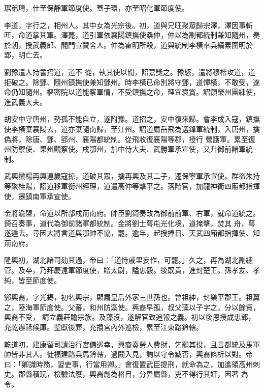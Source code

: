 \begin{pinyinscope}
 琚弟璹，仕至保靜軍節度使。蓋子環，亦至昭化軍節度使。



 李道，字行之，相州人。其中女為光宗後。初，道與兄旺聚眾歸宗澤，澤因事斬旺，命道掌其軍。澤薨，道引軍依襄陽鎮撫使桑仲，仲以為副都統制兼知隨州，奏於朝，授武義郎、閣門宣贊舍人。仲為霍明所殺，道與統制李橫率兵縞素圍明於郢，明亡去。



 劉豫遣人持書招道，道不
 從，執其使以聞，詔嘉獎之。豫怒，遣將穆楷攻道，道拒破之。除鄧、隨州鎮撫使兼知鄧州。時李橫已命別將守鄧，道憚橫，不敢受，遂命仍知隨州。樞密院以道能察軍情，不受鎮撫之命，理宜褒賞。詔領榮州團練使，進武義大夫。



 胡安中守唐州，勢孤不能自立，遂附豫。道招之，安中復來歸。會李成入寇，鎮撫使李橫棄襄陽去，道亦棄隨南歸，至江州。詔道屬岳飛為選鋒軍統制，入唐州，擒偽將，除唐、鄧、郢州、襄陽都統制。從飛收復襄陽等郡，授行
 營護軍。累至復州防禦使、果州觀察使。戌鄂州，加中侍大夫、武勝軍承宣使，又升御前諸軍統制。



 武興蠻楊再興連歲寇掠，道破其眾，擒再興及其二子，遷保寧軍承宣使。群盜朱持等聚桂陽，詔道移軍衡州經理，道遣高仲等擊平之。落階官，加龍神衛四廂都指揮使，遷鎮南軍承宣使。



 金將渝盟，命道以所部戍荊南府。帥臣劉錡奏改為御前前軍、右軍，就命道統之。錡召奏事，道代為御前諸軍都統制。金將劉士萼屯光化境，道掩擊，焚其
 舟，萼遂遁去。尋因大將言道與鄂帥不協，罷。逾年，起授捧日、天武四廂都指揮使、知荊南府。



 隆興初，湖北諸司劾其過，帝曰：「道恃戚里妄作，可罷。」久之，再為湖北副總管。及卒，乃拜慶遠軍節度使，贈太尉，謚忠毅。後既貴，進封楚王。孫孝友、孝純，皆至節度使。



 鄭興裔，字光錫，初名興宗，顯肅皇后外家三世孫也。曾祖紳，封樂平郡王。祖翼之，陸海軍節度使。父蕃，和州防禦使。興裔早孤，叔父藻以子字之，分以餘貲，興裔不受，
 請立義莊贍宗族。及藻沒，遂解官致追報之義。初以後恩授成忠郎，充乾辦祗候庫。聖獻後葬，充攢宮內外巡檢，累至江東路鈐轄。



 乾道初，建康留司請治行宮備巡幸，興裔奏勞人費財，乞罷其役，且言都統及馬軍帥皆非其人。徒福建路兵馬鈐轄，過闕入見，詢以守令臧否，興裔條析以對。帝曰：「卿識時務，習吏事，行當用卿。」會復置武臣提刑，就命為之，加遙領高州刺史。郡縣積玩，檢驗法廢，興裔創為格目，分畀屬縣，吏不得行其奸，因著
 為令。




\end{pinyinscope}
